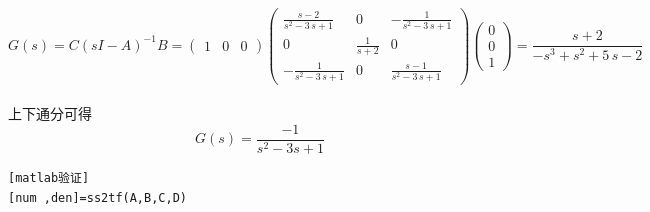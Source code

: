 \documentclass{article}
\begin{document}
$$ G(s)=C(sI-A)^{-1}B = \left(\begin{array}{ccc} 1 & 0 & 0 \end{array}\right) \left(\begin{array}{ccc} \frac{s - 2}{s^2 - 3\, s + 1} & 0 & -\frac{1}{s^2 - 3\, s + 1}\\ 0 & \frac{1}{s + 2} & 0\\ -\frac{1}{s^2 - 3\, s + 1} & 0 & \frac{s - 1}{s^2 - 3\, s + 1} \end{array}\right) \left(\begin{array}{c} 0\\ 0\\ 1 \end{array}\right) =   \frac{s + 2}{ - s^3 + s^2 + 5\, s - 2} $$ \\
\mbox{上下通分可得 } \\
$$G(s)= \frac{-1}{ s^2 -3s +1} $$
\begin{verbatim}[matlab验证]
[num ,den]=ss2tf(A,B,C,D)
\end{verbatim} 
\end{document}
